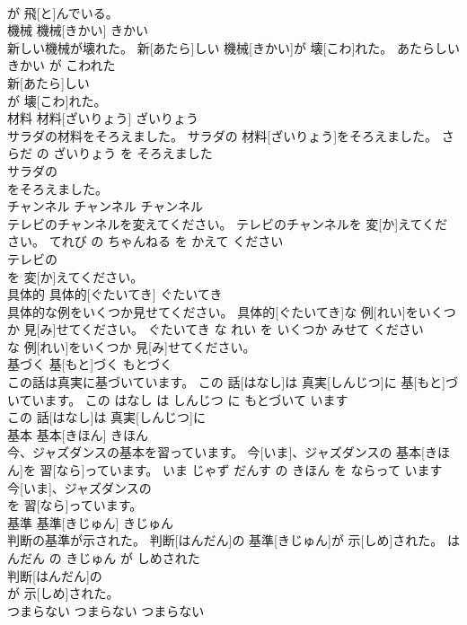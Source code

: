 \documentclass[8pt]{extreport}
\begin{document}
\begin{CJK}{UTF8}{min}
\\	が 飛[と]んでいる。			
\\	機械	機械[きかい]	きかい	
\\	新しい機械が壊れた。	新[あたら]しい 機械[きかい]が 壊[こわ]れた。	あたらしい きかい が こわれた	
\\	新[あたら]しい
\\	が 壊[こわ]れた。			
\\	材料	材料[ざいりょう]	ざいりょう	
\\	サラダの材料をそろえました。	サラダの 材料[ざいりょう]をそろえました。	さらだ の ざいりょう を そろえました	
\\	サラダの
\\	をそろえました。			
\\	チャンネル	チャンネル	チャンネル	
\\	テレビのチャンネルを変えてください。	テレビのチャンネルを 変[か]えてください。	てれび の ちゃんねる を かえて ください	
\\	テレビの
\\	を 変[か]えてください。			
\\	具体的	具体的[ぐたいてき]	ぐたいてき	
\\	具体的な例をいくつか見せてください。	具体的[ぐたいてき]な 例[れい]をいくつか 見[み]せてください。	ぐたいてき な れい を いくつか みせて ください	
\\	な 例[れい]をいくつか 見[み]せてください。			
\\	基づく	基[もと]づく	もとづく	
\\	この話は真実に基づいています。	この 話[はなし]は 真実[しんじつ]に 基[もと]づいています。	この はなし は しんじつ に もとづいて います	
\\	この 話[はなし]は 真実[しんじつ]に
\\	基本	基本[きほん]	きほん	
\\	今、ジャズダンスの基本を習っています。	今[いま]、ジャズダンスの 基本[きほん]を 習[なら]っています。	いま じゃず だんす の きほん を ならって います	
\\	今[いま]、ジャズダンスの
\\	を 習[なら]っています。			
\\	基準	基準[きじゅん]	きじゅん	
\\	判断の基準が示された。	判断[はんだん]の 基準[きじゅん]が 示[しめ]された。	はんだん の きじゅん が しめされた	
\\	判断[はんだん]の
\\	が 示[しめ]された。			
\\	つまらない	つまらない	つまらない	

\end{CJK}
\end{document}
